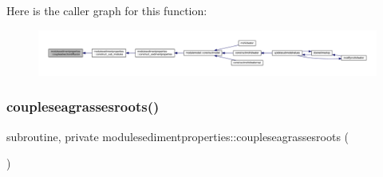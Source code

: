 Here is the caller graph for this function\+:\nopagebreak
\begin{figure}[H]
\begin{center}
\leavevmode
\includegraphics[width=350pt]{namespacemodulesedimentproperties_a7337c30e5645edde83be4dae7d323f3b_icgraph}
\end{center}
\end{figure}
\mbox{\label{namespacemodulesedimentproperties_ab7687e8a644768320a332dacba7eb257}} 
\subsubsection{\texorpdfstring{coupleseagrassesroots()}{coupleseagrassesroots()}}
{\footnotesize\ttfamily subroutine, private modulesedimentproperties\+::coupleseagrassesroots (\begin{DoxyParamCaption}{ }\end{DoxyParamCaption})\hspace{0.3cm}{\ttfamily [private]}}

